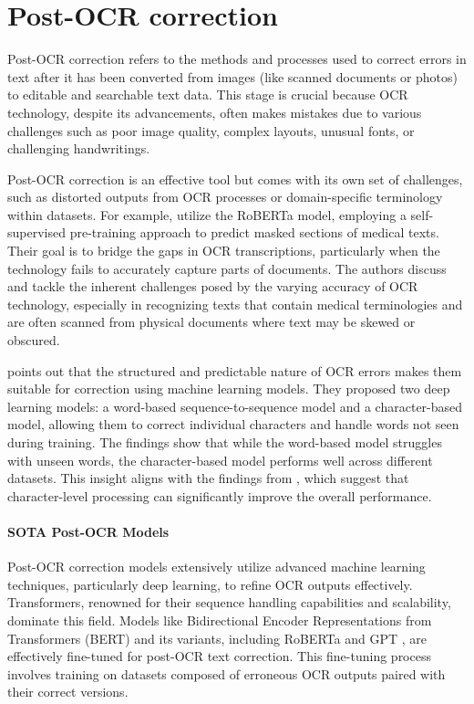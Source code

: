\section{Post-OCR correction}
\label{sec:2_post-ocr_correction}
Post-OCR correction refers to the methods and processes used to correct errors in text after it has been converted from images (like scanned documents or photos) to editable and searchable text data. This stage is crucial because OCR technology, despite its advancements, often makes mistakes due to various challenges such as poor image quality, complex layouts, unusual fonts, or challenging handwritings.

Post-OCR correction is an effective tool but comes with its own set of challenges, such as distorted outputs from OCR processes or domain-specific terminology within datasets. For example, \cite{karthikeyan2021ocr} utilize the RoBERTa model, employing a self-supervised pre-training approach to predict masked sections of medical texts. Their goal is to bridge the gaps in OCR transcriptions, particularly when the technology fails to accurately capture parts of documents. The authors discuss and tackle the inherent challenges posed by the varying accuracy of OCR technology, especially in recognizing texts that contain medical terminologies and are often scanned from physical documents where text may be skewed or obscured.

\cite{mokhtar2018ocr} points out that the structured and predictable nature of OCR errors makes them suitable for correction using machine learning models. They proposed two deep learning models: a word-based sequence-to-sequence model and a character-based model, allowing them to correct individual characters and handle words not seen during training. The findings show that while the word-based model struggles with unseen words, the character-based model performs well across different datasets. This insight aligns with the findings from \cite{kang2021candidate}, which suggest that character-level processing can significantly improve the overall performance.

\paragraph*{SOTA Post-OCR Models}
Post-OCR correction models extensively utilize advanced machine learning techniques, particularly deep learning, to refine OCR outputs effectively. Transformers, renowned for their sequence handling capabilities and scalability, dominate this field. Models like Bidirectional Encoder Representations from Transformers (BERT) \citep{devlin-etal-2019-bert} and its variants, including RoBERTa \citep{liu2019roberta} and GPT \citep{radford2018improving}, are effectively fine-tuned for post-OCR text correction. This fine-tuning process involves training on datasets composed of erroneous OCR outputs paired with their correct versions. 

